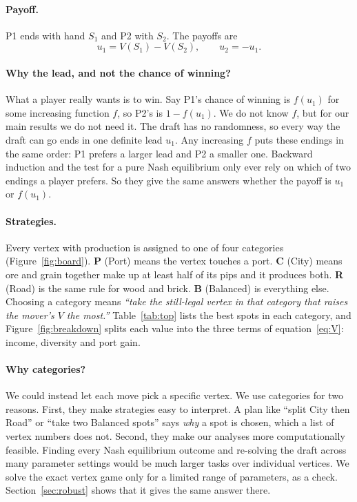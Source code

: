 \documentclass[11pt]{article}
\begin{document}
\paragraph{Payoff.} P1 ends with hand $S_1$ and P2 with $S_2$. The payoffs are
\begin{equation}\label{eq:u}
u_1 = V(S_1)-V(S_2), \qquad u_2=-u_1 .
\end{equation}
\paragraph{Why the lead, and not the chance of winning?} What a player really wants is to win. Say P1's chance of winning is $f(u_1)$ for some increasing function $f$, so P2's is $1-f(u_1)$. We do not know $f$, but for our main results we do not need it. The draft has no randomness, so every way the draft can go ends in one definite lead $u_1$. Any increasing $f$ puts these endings in the same order: P1 prefers a larger lead and P2 a smaller one. Backward induction and the test for a pure Nash equilibrium only ever rely on which of two endings a player prefers. So they give the same answers whether the payoff is $u_1$ or $f(u_1)$.

\paragraph{Strategies.} Every vertex with production is assigned to one of four categories (Figure~\ref{fig:board}). \textbf{P} (Port) means the vertex touches a port. \textbf{C} (City) means ore and grain together make up at least half of its pips and it produces both. \textbf{R} (Road) is the same rule for wood and brick. \textbf{B} (Balanced) is everything else. Choosing a category means \emph{``take the still-legal vertex in that category that raises the mover's $V$ the most.''} Table~\ref{tab:top} lists the best spots in each category, and Figure~\ref{fig:breakdown} splits each value into the three terms of equation~\eqref{eq:V}: income, diversity and port gain.

\paragraph{Why categories?} We could instead let each move pick a specific vertex. We use categories for two reasons. First, they make strategies easy to interpret. A plan like ``split City then Road'' or ``take two Balanced spots'' says \emph{why} a spot is chosen, which a list of vertex numbers does not. Second, they make our analyses more computationally feasible. Finding every Nash equilibrium outcome and re-solving the draft across many parameter settings would be much larger tasks over individual vertices. We solve the exact vertex game only for a limited range of parameters, as a check. Section~\ref{sec:robust} shows that it gives the same answer there.
\end{document}
